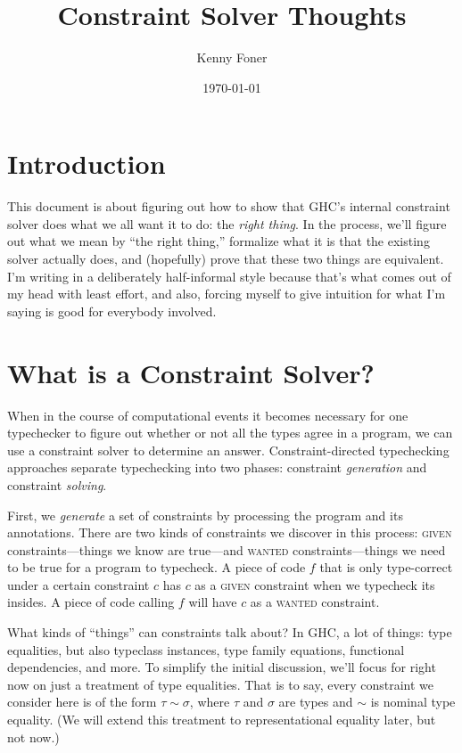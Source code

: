 \documentclass[10pt, letterpaper, oneside]{article}
\title{Constraint Solver Thoughts}
\author{Kenny Foner}
\date{\today}
\newcommand{\given}  {\textsc{given} \xpsace}
\newcommand{\wanted} {\textsc{wanted}\xspace}
\begin{document}
\maketitle

\section{Introduction}

This document is about figuring out how to show that GHC's internal constraint solver does what we all want it to do: the \emph{right thing}. In the process, we'll figure out what we mean by ``the right thing,'' formalize what it is that the existing solver actually does, and (hopefully) prove that these two things are equivalent. I'm writing in a deliberately half-informal style because that's what comes out of my head with least effort, and also, forcing myself to give intuition for what I'm saying is good for everybody involved.

\section{What is a Constraint Solver?}

When in the course of computational events it becomes necessary for one typechecker to figure out whether or not all the types agree in a program, we can use a constraint solver to determine an answer. Constraint-directed typechecking approaches separate typechecking into two phases: constraint \emph{generation} and constraint \emph{solving}.

First, we \emph{generate} a set of constraints by processing the program and its annotations. There are two kinds of constraints we discover in this process: \given constraints---things we know are true---and \wanted constraints---things we need to be true for a program to typecheck. A piece of code \(f\) that is only type-correct under a certain constraint \(c\) has \(c\) as a \given constraint when we typecheck its insides. A piece of code calling \(f\) will have \(c\) as a \wanted constraint.

What kinds of ``things'' can constraints talk about? In GHC, a lot of things: type equalities, but also typeclass instances, type family equations, functional dependencies, and more. To simplify the initial discussion, we'll focus for right now on just a treatment of type equalities. That is to say, every constraint we consider here is of the form \(\tau \sim \sigma\), where \(\tau\) and \(\sigma\) are types and \(\sim\) is nominal type equality. (We will extend this treatment to representational equality later, but not now.)
\end{document}
